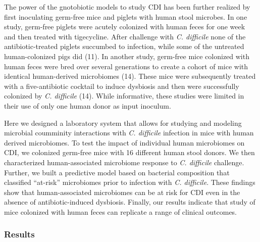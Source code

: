 \documentclass[11pt,]{article}
\begin{document}
The power of the gnotobiotic models to study CDI has been further
realized by first inoculating germ-free mice and piglets with human
stool microbes. In one study, germ-free piglets were acutely colonized
with human feces for one week and then treated with tigecycline. After
challenge with \emph{C. difficile} none of the antibiotic-treated
piglets succumbed to infection, while some of the untreated
human-colonized pigs did (11). In another study, germ-free mice
colonized with human feces were bred over several generations to create
a cohort of mice with identical human-derived microbiomes (14). These
mice were subsequently treated with a five-antibiotic cocktail to induce
dysbiosis and then were successfully colonized by \emph{C. difficile}
(14). While informative, these studies were limited in their use of only
one human donor as input inoculum.

Here we designed a laboratory system that allows for studying and
modeling microbial coumminity interactions with \emph{C. difficile}
infection in mice with human derived microbiomes. To test the impact of
individual human microbiomes on CDI, we colonized germ-free mice with 16
different human stool donors. We then characterized human-associated
microbiome response to \emph{C. difficile} challenge. Further, we built
a predictive model based on bacterial composition that classified
``at-risk'' microbiomes prior to infection with \emph{C. difficile}.
These findings show that human-associated microbiomes can be at risk for
CDI even in the absence of antibiotic-induced dysbiosis. Finally, our
results indicate that study of mice colonized with human feces can
replicate a range of clinical outcomes.

\subsubsection{Results}\label{results}
\end{document}
